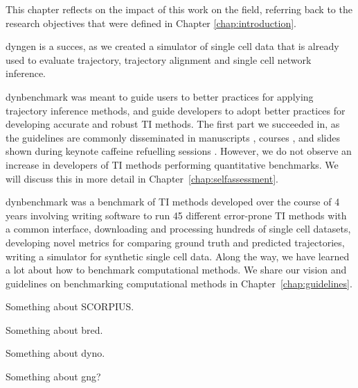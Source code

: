 	
This chapter reflects on the impact of this work on the field, referring back to the research objectives that were defined in Chapter \ref{chap:introduction}. 
	
dyngen is a succes, as we created a simulator of single cell data that is already used to evaluate trajectory\cite{saelens_comparisonsinglecelltrajectory_2019}, trajectory alignment\cite{vandenberge_trajectorybaseddifferentialexpression_2019} and single cell network inference\cite{pratapa_benchmarkingalgorithmsgene_2019}.

dynbenchmark was meant to guide users to better practices for applying trajectory inference methods, and guide developers to adopt better practices for developing accurate and robust TI methods. The first part we succeeded in, as the guidelines are commonly disseminated in manuscripts \cite{lafzi_tutorialguidelinesexperimental_2018,luecken_currentbestpractices_2019}, courses \cite{kiselev_analysissinglecell_2019,martens_analysissinglecell_2019}, and slides shown during keynote caffeine refuelling sessions \cite{hemberg_coffeebreakanalysis_2019}. However, we do not observe an increase in developers of TI methods performing quantitative benchmarks. We will discuss this in more detail in Chapter~\ref{chap:selfassessment}.

dynbenchmark was a benchmark of TI methods developed over the course of 4 years involving writing software to run 45 different error-prone TI methods with a common interface, downloading and processing hundreds of single cell datasets, developing novel metrics for comparing ground truth and predicted trajectories, writing a simulator for synthetic single cell data. Along the way, we have learned a lot about how to benchmark computational methods. We share our vision and guidelines on benchmarking computational methods in Chapter~\ref{chap:guidelines}.

Something about SCORPIUS.

Something about bred.

Something about dyno.

Something about gng?



